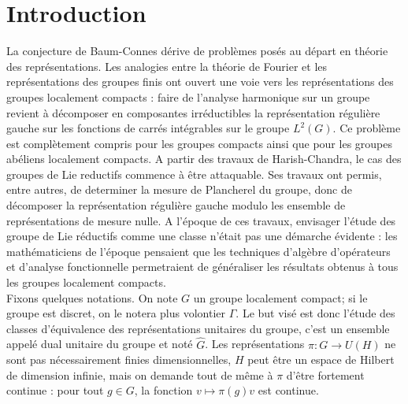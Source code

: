 \section{Introduction}

La conjecture de Baum-Connes dérive de problèmes posés au départ en théorie des représentations. Les analogies entre la théorie de Fourier et les représentations des groupes finis ont ouvert une voie vers les représentations des groupes localement compacts : faire de l'analyse harmonique sur un groupe revient à décomposer en composantes irréductibles la représentation régulière gauche sur les fonctions de carrés intégrables sur le groupe $L^2(G)$. Ce problème est complètement compris pour les groupes compacts ainsi que pour les groupes abéliens localement compacts. A partir des travaux de Harish-Chandra, le cas des groupes de Lie reductifs commence à être attaquable. Ses travaux ont permis, entre autres, de determiner la mesure de Plancherel du groupe, donc de décomposer la représentation régulière gauche modulo les ensemble de représentations de mesure nulle. A l'époque de ces travaux, envisager l'étude des groupe de Lie réductifs comme une classe n'était pas une démarche évidente : les mathématiciens de l'époque pensaient que les techniques d'algèbre d'opérateurs et d'analyse fonctionnelle permetraient de généraliser les résultats obtenus à tous les groupes localement compacts.\\

Fixons quelques notations. On note $G$ un groupe localement compact; si le groupe est discret, on le notera plus volontier $\Gamma$. Le but visé est donc l'étude des classes d'équivalence des représentations unitaires du groupe, c'est un ensemble appelé dual unitaire du groupe et noté $\hat G$. Les représentations $\pi : G \rightarrow U(H)$ ne sont pas nécessairement finies dimensionnelles, $H$ peut être un espace de Hilbert de dimension infinie, mais on demande tout de même à $\pi$ d'être fortement continue : pour tout $g\in G$, la fonction $v\mapsto \pi(g) v$ est continue.\\

